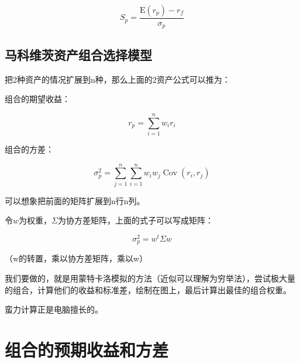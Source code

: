 \documentclass[
  letterpaper,
  DIV=11,
  numbers=noendperiod]{scrreprt}
\begin{document}
\[
S_p=\frac{\mathrm{E}\left(r_p\right)-r_f}{\sigma_p}
\]

\hypertarget{ux9a6cux79d1ux7ef4ux8328ux8d44ux4ea7ux7ec4ux5408ux9009ux62e9ux6a21ux578b}{%
\subsection{马科维茨资产组合选择模型}\label{ux9a6cux79d1ux7ef4ux8328ux8d44ux4ea7ux7ec4ux5408ux9009ux62e9ux6a21ux578b}}

把2种资产的情况扩展到n种，那么上面的2资产公式可以推为：

组合的期望收益：

\[
r_p = \sum_{i=1}^n {w_i r_i}
\]

组合的方差：

\[
\sigma_p^2 = \sum_{j=1}^n \sum_{i=1}^n w_i w_j \operatorname{Cov}(r_i,r_j) 
\]

可以想象把前面的矩阵扩展到n行n列。

令\(w\)为权重，\(\Sigma\)为协方差矩阵，上面的式子可以写成矩阵：

\[
\sigma_p^2 = w^t \Sigma w
\]

（w的转置，乘以协方差矩阵，乘以w）

我们要做的，就是用蒙特卡洛模拟的方法（近似可以理解为穷举法），尝试极大量的组合，计算他们的收益和标准差，绘制在图上，最后计算出最佳的组合权重。

蛮力计算正是电脑擅长的。

\hypertarget{ux7ec4ux5408ux7684ux9884ux671fux6536ux76caux548cux65b9ux5dee}{%
\section{组合的预期收益和方差}\label{ux7ec4ux5408ux7684ux9884ux671fux6536ux76caux548cux65b9ux5dee}}
\end{document}
